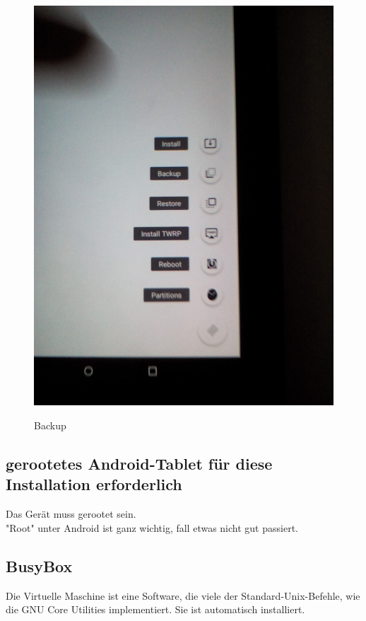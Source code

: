 \documentclass[11pt,a4paper]{article}
\begin{document}
\begin{figure}[H]
\begin{center} \includegraphics[scale=0.1]{./Image/img10}  \\
\caption{Backup}
\end{center}
\end{figure} 

\subsection{gerootetes Android-Tablet für diese Installation erforderlich}
Das Gerät muss gerootet sein. \\
"Root" unter Android ist ganz wichtig, fall etwas nicht gut passiert.

\subsection{BusyBox}
Die Virtuelle Maschine ist eine Software, die viele der Standard-Unix-Befehle, wie die GNU Core Utilities implementiert.
Sie ist automatisch installiert. \\
\end{document}
